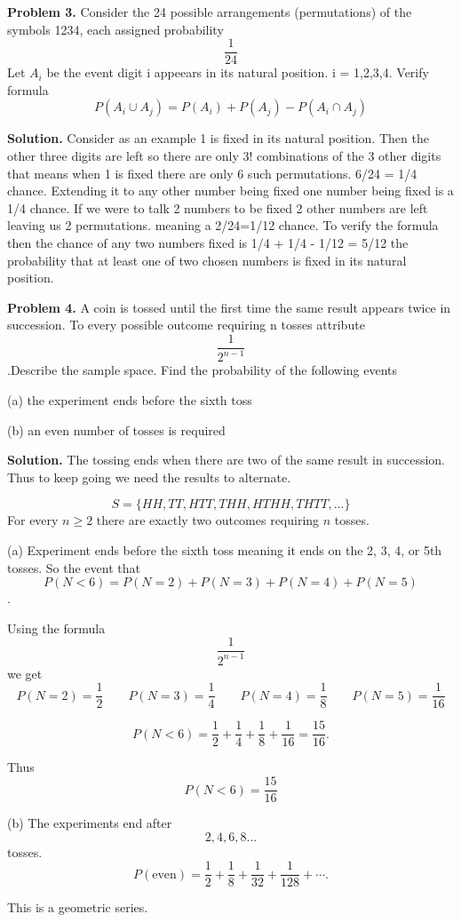 \documentclass[12pt]{article}
\begin{document}
\textbf{Problem 3.}
Consider the 24 possible arrangements (permutations) of the symbols 1234, each assigned probability \[\frac{1}{24}\]
Let $A_i$ be the event digit i appeears in its natural position. i = 1,2,3,4. Verify formula \[P(A_i \cup A_j) = P(A_i) + P(A_j) - P(A_i \cap A_j)\] 

\textbf{Solution.}
Consider as an example 1 is fixed in its natural position. Then the other three digits are left so there are only 3! combinations of the 3 other digits that means when 1 is fixed there are only 6 such permutations. 6/24 = 1/4 chance. Extending it to any other number being fixed one number being fixed is a 1/4 chance. If we were to talk 2 numbers to be fixed 2 other numbers are left leaving us 2 permutations. meaning a 2/24=1/12 chance. To verify the formula then the chance of any two numbers fixed is 1/4 + 1/4 - 1/12 = 5/12 the probability that at least one of two chosen numbers is fixed in its natural position. 

\textbf{Problem 4.}
A coin is tossed until the first time the same result appears twice in succession. To every possible outcome requiring n tosses attribute \[\frac{1}{2^{n-1}}\].Describe the sample space. Find the probability of the following events 

(a) the experiment ends before the sixth toss

(b) an even number of tosses is required

\textbf{Solution.}
The tossing ends when there are two of the same result in succession. Thus to keep going we need the results to alternate. 

\[S = \{HH, TT, HTT, THH, HTHH, THTT,...\}\]
For every  \(n \geq 2\) there are exactly two outcomes requiring \(n\) tosses.

(a) Experiment ends before the sixth toss meaning it ends on the 2, 3, 4, or 5th tosses. So the event that \[P(N < 6) = P(N=2)+P(N=3)+P(N=4)+P(N=5)\].

Using the formula \[\frac{1}{2^{n-1}}\] we get \[P(N=2) = \frac12 \qquad P(N=3) = \frac14 \qquad P(N=4) = \frac18 \qquad P(N=5) = \frac1{16}\]

\[
P(N<6)
=
\frac12+\frac14+\frac18+\frac1{16}
=
\frac{15}{16}.
\]

Thus \[P(N<6) = \frac{15}{16}\]

(b) The experiments end after \[2, 4, 6, 8 ...\] tosses.
\[
P(\text{even})
=
\frac12+\frac18+\frac1{32}+\frac1{128}+\cdots.
\]

This is a geometric series. 
\end{document}
